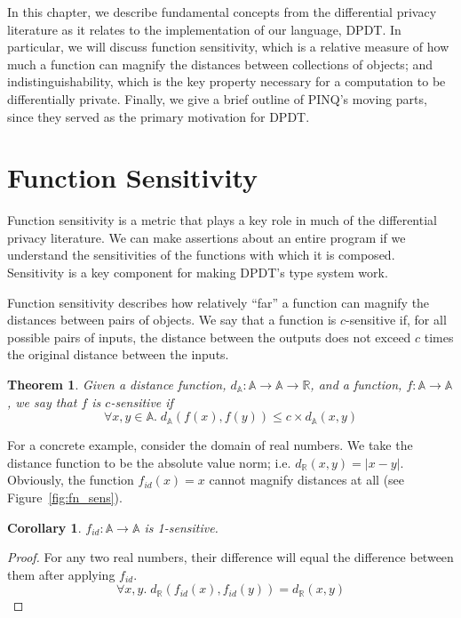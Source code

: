 \documentclass[12pt]{report}
\newtheorem{thm}[defn]{Theorem}
\newtheorem{cor}[defn]{Corollary}
\begin{document}
In this chapter, we describe fundamental concepts from the differential privacy literature as it relates to the implementation of our language, DPDT.
In particular, we will discuss function sensitivity, which is a relative measure of how much a function can magnify the distances between collections of objects; and indistinguishability, which is the key property necessary for a computation to be differentially private.
Finally, we give a brief outline of PINQ's moving parts, since they served as the primary motivation for DPDT.

\section{Function Sensitivity}\label{subsec:fn_sens}

Function sensitivity is a metric that plays a key role in much of the differential privacy literature.
We can make assertions about an entire program if we understand the sensitivities of the functions with which it is composed.
Sensitivity is a key component for making DPDT's type system work.

Function sensitivity describes how relatively ``far'' a function can magnify the distances between pairs of objects.
We say that a function is $c$-sensitive if, for all possible pairs of inputs, the distance between the outputs does not exceed $c$ times the original distance between the inputs.

\begin{thm}\label{thm:csens}
  Given a distance function, $d_{\mathbb A} : \mathbb A \rightarrow \mathbb A \rightarrow \mathbb R$, and a function, $f : \mathbb A \rightarrow \mathbb A$, we say that $f$ is $c$-sensitive if
  $$\forall x,y\in\mathbb A.\; d_{\mathbb A}(f(x),f(y)) \le c \times d_{\mathbb A}(x,y)$$
\end{thm}

\begin{samepage}
For a concrete example, consider the domain of real numbers.
We take the distance function to be the absolute value norm; i.e. $d_\mathbb{R}(x,y) = |x - y|$.
Obviously, the function $f_{id}(x)=x$ cannot magnify distances at all (see Figure~\ref{fig:fn_sens}).
\begin{cor}
$f_{id} : \mathbb A \rightarrow \mathbb A$ is 1-sensitive.
\end{cor}
\begin{proof}
For any two real numbers, their difference will equal the difference between them after applying $f_{id}$.
\nopagebreak
\[
  \forall x,y.\; d_\mathbb{R}(f_{id}(x),f_{id}(y)) = d_\mathbb{R}(x,y)
\]
\end{proof}
\end{samepage}
\end{document}
